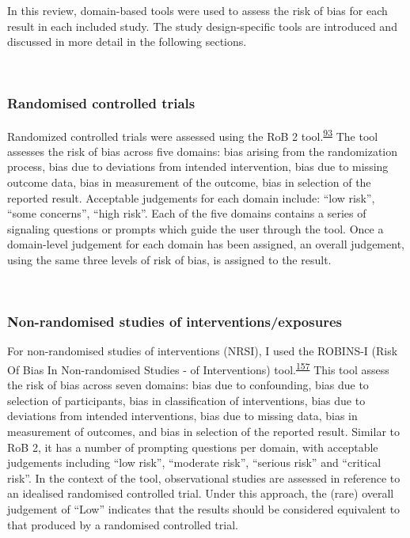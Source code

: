 \documentclass[a4paper, twoside]{templates/ociamthesis}
\begin{document}
In this review, domain-based tools were used to assess the risk of bias for each result in each included study. The study design-specific tools are introduced and discussed in more detail in the following sections.

~

\hypertarget{randomised-controlled-trials-1}{%
\subsubsection{Randomised controlled trials}\label{randomised-controlled-trials-1}}

Randomized controlled trials were assessed using the RoB 2 tool.\textsuperscript{\protect\hyperlink{ref-sterne2019}{93}} The tool assesses the risk of bias across five domains: bias arising from the randomization process, bias due to deviations from intended intervention, bias due to missing outcome data, bias in measurement of the outcome, bias in selection of the reported result. Acceptable judgements for each domain include: ``low risk'', ``some concerns'', ``high risk''. Each of the five domains contains a series of signaling questions or prompts which guide the user through the tool. Once a domain-level judgement for each domain has been assigned, an overall judgement, using the same three levels of risk of bias, is assigned to the result.

~

\hypertarget{rob-tools-nrse}{%
\subsubsection{Non-randomised studies of interventions/exposures}\label{rob-tools-nrse}}

For non-randomised studies of interventions (NRSI), I used the ROBINS-I (Risk Of Bias In Non-randomised Studies - of Interventions) tool.\textsuperscript{\protect\hyperlink{ref-sterne2016}{157}} This tool assess the risk of bias across seven domains: bias due to confounding, bias due to selection of participants, bias in classification of interventions, bias due to deviations from intended interventions, bias due to missing data, bias in measurement of outcomes, and bias in selection of the reported result. Similar to RoB 2, it has a number of prompting questions per domain, with acceptable judgements including ``low risk'', ``moderate risk'', ``serious risk'' and ``critical risk''. In the context of the tool, observational studies are assessed in reference to an idealised randomised controlled trial. Under this approach, the (rare) overall judgement of ``Low'' indicates that the results should be considered equivalent to that produced by a randomised controlled trial.
\end{document}
